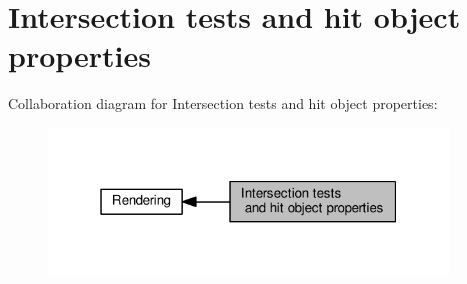 \hypertarget{group__intersection__test__prperties}{}\section{Intersection tests and hit object properties}
\label{group__intersection__test__prperties}
Collaboration diagram for Intersection tests and hit object properties\+:
\nopagebreak
\begin{figure}[H]
\begin{center}
\leavevmode
\includegraphics[width=301pt]{group__intersection__test__prperties}
\end{center}
\end{figure}
